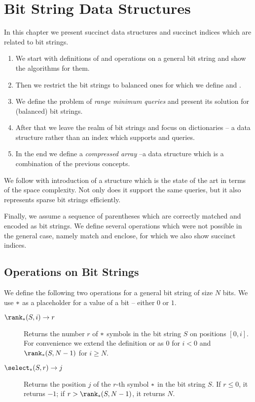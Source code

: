\chapter{Bit String Data Structures}\label{c:bit-strings}

In this chapter we present succinct data structures and succinct indices which are related to bit strings.
\begin{enumerate}
	\item We start with definitions of \rank{} and \select{} operations on a general bit string and show the algorithms for them.
	\item Then we restrict the bit strings to balanced ones for which we define \match{} and \enclose{}.
	\item We define the problem of \emph{range minimum queries} and present its solution for (balanced) bit strings.
	\item After that we leave the realm of bit strings and focus on dictionaries -- a data structure rather than an index which supports \rank{} and \select{} queries.
	\item In the end we define a \emph{compressed array} --a data structure which is a combination of the previous concepts.
\end{enumerate}

We follow with introduction of a structure which is the state of the art in terms of the space complexity.
Not only does it support the same queries, but it also represents sparse bit strings efficiently.

Finally, we assume a sequence of parentheses which are correctly matched and encoded as bit strings.
We define several operations which were not possible in the general case, namely match and enclose, for which we also show succinct indices.

\section{Operations on Bit Strings}\label{s:op-bs}

We define the following two operations for a general bit string of size $N$ bits.
We use $\ph$ as a placeholder for a value of a bit -- either $0$ or $1$.
\begin{description}
	\item[$\rank_{\ph}(S, i) \rightarrow r$]
	Returns the number $r$ of $\ph$ symbols in the bit string $S$ on positions $[0, i]$.
	For convenience we extend the definition or \rank{} as $0$ for $i < 0$ and $\rank_{\ph}(S, N - 1)$ for $i \ge N$.

	\item[$\select_{\ph}(S, r) \rightarrow j$]
	Returns the position $j$ of the $r$-th symbol $\ph$ in the bit string $S$.
	If $r \le 0$, it returns $-1$; if $r > \rank_{\ph}(S, N - 1)$, it returns $N$.
\end{description}

